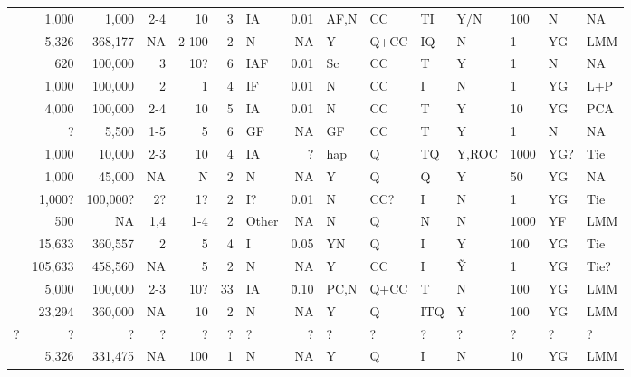 \documentclass[11pt]{article}
\begin{document}
\begin{table}[hb!]
\begin{tabular}{lrrrrrlrlllllll}
    \cite{li_correcting_2010}        & 1,000 &    1,000 &  2-4 &   10 &  3 &  IA & 0.01 &AF,N & CC &  TI & Y/N & 100 &   N &  NA \\
    \cite{kang_variance_2010}        & 5,326 &  368,177 &   NA &2-100 &  2 &   N &   NA &   Y &Q+CC&  IQ &   N &   1 &  YG & LMM \\
    \cite{thornton_roadtrips:_2010}  &   620 &  100,000 &    3 &  10? &  6 & IAF & 0.01 &  Sc & CC &   T &   Y &   1 &   N &  NA \\
    \cite{price_new_2010}            & 1,000 &  100,000 &    2 &    1 &  4 &  IF & 0.01 &   N & CC &   I &   N &   1 &  YG & L+P \\
    \cite{wu_comparison_2011}        & 4,000 &  100,000 &  2-4 &   10 &  5 &  IA & 0.01 &   N & CC &   T &   Y &  10 &  YG & PCA \\
    \cite{bouaziz_accounting_2011}   &     ? &    5,500 &  1-5 &    5 &  6 &  GF &   NA &  GF & CC &   T &   Y &   1 &   N &  NA \\
    \cite{liu_controlling_2011}      & 1,000 &   10,000 &  2-3 &   10 &  4 &  IA &    ? & hap &  Q &  TQ &Y,ROC&1000 &  YG?& Tie \\
    \cite{hoffman_correcting_2013}   & 1,000 &   45,000 &   NA &    N &  2 &   N &   NA &   Y &  Q &   Q &   Y &  50 &  YG &  NA \\
    \cite{sul_mixed_2013}            & 1,000?&  100,000?&   2? &   1? &  2 &  I? & 0.01 &   N &CC? &   I &   N &   1 &  YG & Tie \\
    \cite{wang_analytical_2013}      &   500 &       NA &  1,4 &  1-4 &  2 &Other&   NA &   N &  Q &   N &   N &1000 &  YF & LMM \\
    \cite{tucker_improving_2014}     &15,633 &  360,557 &    2 &    5 &  4 &   I & 0.05 &  YN &  Q &   I &   Y & 100 &  YG & Tie \\
    \cite{yang_advantages_2014}      &105,633&  458,560 &   NA &    5 &  2 &   N &   NA &   Y & CC &   I & \~Y &   1 &  YG & Tie?\\
    \cite{song_testing_2015}         & 5,000 &  100,000 &  2-3 &  10? & 33 &  IA &\~0.10&PC,N &Q+CC&   T &   N & 100 &  YG & LMM \\
    \cite{loh_efficient_2015}        &23,294 &  360,000 &   NA &   10 &  2 &   N &   NA &   Y &  Q & ITQ &   Y & 100 &  YG & LMM \\
    ?                                &     ? &        ? &    ? &    ? &  ? &   ? &    ? &   ? &  ? &   ? &   ? &   ? &   ? &   ? \\
    \cite{sul_population_2018}       & 5,326 &  331,475 &   NA &  100 &  1 &   N &   NA &   Y &  Q &   I &   N &  10 &  YG & LMM \\

\end{tabular}
\end{table}
\end{document}
